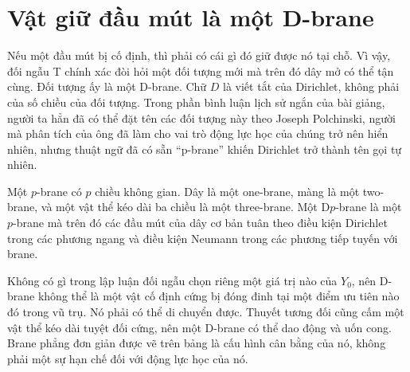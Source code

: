 \begin{classroomqa}
\end{classroomqa}

\section{Vật giữ đầu mút là một D-brane}

Nếu một đầu mút bị cố định, thì phải có cái gì đó giữ được nó tại chỗ. Vì vậy, đối ngẫu T chính xác đòi hỏi một đối tượng mới mà trên đó dây mở có thể tận cùng. Đối tượng ấy là một D-brane. Chữ \(D\) là viết tắt của Dirichlet, không phải của số chiều của đối tượng. Trong phần bình luận lịch sử ngắn của bài giảng, người ta hẳn đã có thể đặt tên các đối tượng này theo Joseph Polchinski, người mà phân tích của ông đã làm cho vai trò động lực học của chúng trở nên hiển nhiên, nhưng thuật ngữ đã có sẵn ``p-brane'' khiến Dirichlet trở thành tên gọi tự nhiên.

Một \(p\)-brane có \(p\) chiều không gian. Dây là một one-brane, màng là một two-brane, và một vật thể kéo dài ba chiều là một three-brane. Một D\(p\)-brane là một \(p\)-brane mà trên đó các đầu mút của dây cơ bản tuân theo điều kiện Dirichlet trong các phương ngang và điều kiện Neumann trong các phương tiếp tuyến với brane.

Không có gì trong lập luận đối ngẫu chọn riêng một giá trị nào của \(Y_0\), nên D-brane không thể là một vật cố định cứng bị đóng đinh tại một điểm ưu tiên nào đó trong vũ trụ. Nó phải có thể di chuyển được. Thuyết tương đối cũng cấm một vật thể kéo dài tuyệt đối cứng, nên một D-brane có thể dao động và uốn cong. Brane phẳng đơn giản được vẽ trên bảng là cấu hình cân bằng của nó, không phải một sự hạn chế đối với động lực học của nó.

\begin{classroomqa}
\end{classroomqa}

